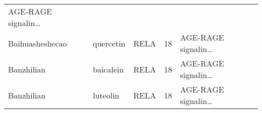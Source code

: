 \documentclass[
]{article}
\begin{document}
\begin{longtable}[]{@{}lllll@{}}
\begin{minipage}[t]{0.21\columnwidth}
AGE-RAGE signalin\ldots{}\strut
\end{minipage}\tabularnewline
\begin{minipage}[t]{0.17\columnwidth}\raggedright
Baihuasheshecao\strut
\end{minipage} & \begin{minipage}[t]{0.16\columnwidth}\raggedright
quercetin\strut
\end{minipage} & \begin{minipage}[t]{0.12\columnwidth}\raggedright
RELA\strut
\end{minipage} & \begin{minipage}[t]{0.19\columnwidth}\raggedright
18\strut
\end{minipage} & \begin{minipage}[t]{0.21\columnwidth}\raggedright
AGE-RAGE signalin\ldots{}\strut
\end{minipage}\tabularnewline
\begin{minipage}[t]{0.17\columnwidth}\raggedright
Banzhilian\strut
\end{minipage} & \begin{minipage}[t]{0.16\columnwidth}\raggedright
baicalein\strut
\end{minipage} & \begin{minipage}[t]{0.12\columnwidth}\raggedright
RELA\strut
\end{minipage} & \begin{minipage}[t]{0.19\columnwidth}\raggedright
18\strut
\end{minipage} & \begin{minipage}[t]{0.21\columnwidth}\raggedright
AGE-RAGE signalin\ldots{}\strut
\end{minipage}\tabularnewline
\begin{minipage}[t]{0.17\columnwidth}\raggedright
Banzhilian\strut
\end{minipage} & \begin{minipage}[t]{0.16\columnwidth}\raggedright
luteolin\strut
\end{minipage} & \begin{minipage}[t]{0.12\columnwidth}\raggedright
RELA\strut
\end{minipage} & \begin{minipage}[t]{0.19\columnwidth}\raggedright
18\strut
\end{minipage} & \begin{minipage}[t]{0.21\columnwidth}\raggedright
AGE-RAGE signalin\ldots{}\strut
\end{minipage}\tabularnewline

\end{longtable}
\end{document}
